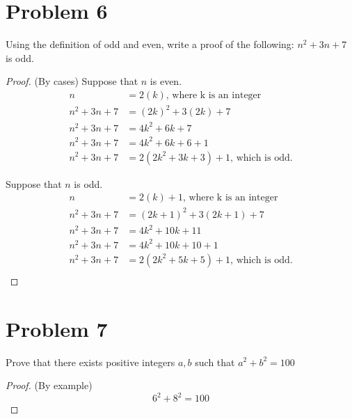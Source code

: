\documentclass{article}
\newenvironment{problem}[1]{
  \nobreak\section*{Problem #1}
}{}
\begin{document}
  \begin{problem}{6}
    Using the definition of odd and even, write a proof of the following: $n^2 + 3n + 7$ is odd.

    \begin{proof}(By cases) Suppose that $n$ is even.
      \begin{equation*}
        \begin{split}
          n & = 2(k)\text{, where k is an integer}\\
          n^2 + 3n + 7 & = (2k)^2 + 3(2k) + 7\\
          n^2 + 3n + 7 & = 4k^2 + 6k + 7\\
          n^2 + 3n + 7 & = 4k^2 + 6k + 6 + 1\\
          n^2 + 3n + 7 & = 2(2k^2 + 3k + 3) + 1\text{, which is odd.}
        \end{split}
      \end{equation*}
      
      Suppose that $n$ is odd.
      \begin{equation*}
        \begin{split}
          n & = 2(k) + 1\text{, where k is an integer}\\
          n^2 + 3n + 7 & = (2k + 1)^2 + 3(2k + 1) + 7\\
          n^2 + 3n + 7 & = 4k^2 + 10k + 11\\
          n^2 + 3n + 7 & = 4k^2 + 10k + 10 + 1\\
          n^2 + 3n + 7 & = 2(2k^2 + 5k + 5) + 1\text{, which is odd.}\\
        \end{split}
      \end{equation*}
    \end{proof}
  \end{problem}

  \begin{problem}{7}
    Prove that there exists positive integers $a, b$ such that $a^2 + b^2 = 100$

    \begin{proof}(By example)
      \begin{equation*}
        6^2 + 8^2 = 100
      \end{equation*}
    \end{proof}
  \end{problem}
\end{document}
